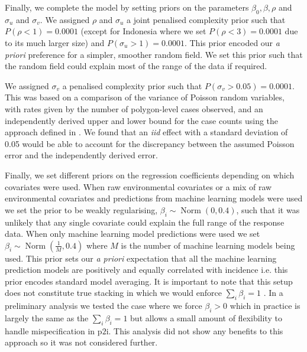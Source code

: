 \documentclass[review]{elsarticle}
\begin{document}
Finally, we complete the model by setting priors on the parameters $\beta_0, \beta, \rho$ and $\sigma_u$ and $\sigma_v$. 
We assigned $\rho$ and $\sigma_u$ a joint penalised complexity prior \citep{fuglstad2018constructing} such that $P(\rho < 1) = 0.0001$ (except for Indonesia where we set $P(\rho < 3) = 0.0001$ due to its much larger size) and $P(\sigma_u > 1) = 0.0001$. 
This prior encoded our \emph{a priori} preference for a simpler, smoother random field.
We set this prior such that the random field could explain most of the range of the data if required.

We assigned $\sigma_v$ a penalised complexity prior \citep{simpson2017penalising} such that $P(\sigma_v > 0.05) =  0.0001$. 
This was based on a comparison of the variance of Poisson random variables, with rates given by the number of polygon-level cases observed, and an independently derived upper and lower bound for the case counts using the approach defined in \citep{cibulskis2011worldwide}. 
We found that an \emph{iid} effect with a standard deviation of 0.05 would be able to account for the discrepancy between the assumed Poisson error and the independently derived error.

Finally, we set different priors on the regression coefficients depending on which covariates were used.
When raw environmental covariates or a mix of raw environmental covariates and predictions from machine learning models were used we set the prior to be weakly regularising, $\beta_i \sim \operatorname{Norm}(0, 0.4)$, such that it was unlikely that any single covariate could explain the full range of the response data.
When only machine learning model predictions were used we set $\beta_i \sim \operatorname{ Norm}(\frac{1}{M}, 0.4)$ where $M$ is the number of machine learning models being used. 
This prior  sets our \emph{a priori} expectation that all the machine learning prediction models are positively and equally correlated with incidence i.e. this prior encodes standard model averaging.
It is important to note that this setup does not constitute true stacking in which we would enforce $\sum_i \beta_i = 1$ \citep{bhatt2017improved}.
In a preliminary analysis we tested the case where we force $\beta_i > 0$ which in practice is largely the same as the $\sum_i \beta_i = 1$  \citep{breiman1996stacked} but allows a small amount of flexibility to handle mispecification in $\mathrm{p2i}$.
This analysis did not show any benefits to this approach so it was not considered further.
\end{document}
